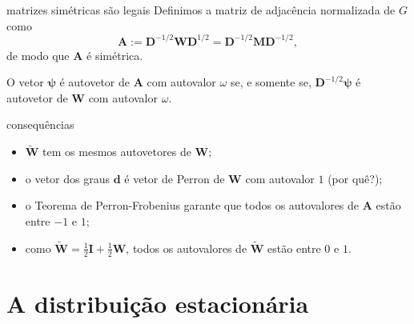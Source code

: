 \documentclass{beamer}
\begin{document}
\begin{frame}{matrizes simétricas são legais}
    Definimos a \alert{matriz de adjacência normalizada} de \(G\) como
    \begin{equation*}
        \mathbf{A} := \mathbf{D}^{-1/2} \mathbf{W} \mathbf{D}^{1/2} = \mathbf{D}^{-1/2} \mathbf{M} \mathbf{D}^{-1/2},
    \end{equation*} de modo que \(\mathbf{A}\) é simétrica.
    \pause
    \begin{prop}
        O vetor \(\mathbf{\psi}\) é autovetor de \(\mathbf{A}\) com autovalor \(\omega\) se, e somente se, \(\mathbf{D}^{-1/2}\mathbf{\psi}\) é autovetor de \(\mathbf{W}\) com autovalor \(\omega\).
    \end{prop}
\end{frame}

\begin{frame}{consequências}
    \begin{itemize}
        \item \(\widetilde{\mathbf{W}}\) tem os mesmos autovetores de \(\mathbf{W}\);\pause
        \item o vetor dos graus \(\mathbf{d}\) é \alert{vetor de Perron} de \(\mathbf{W}\) com autovalor \(1\) (por quê?);\pause
        \item o Teorema de Perron-Frobenius garante que todos os autovalores de \(\mathbf{A}\) estão entre \(-1\) e \(1\);\pause
        \item como \(\widetilde{\mathbf{W}} = \frac{1}{2}\mathbf{I} + \frac{1}{2}\mathbf{W}\), todos os autovalores de \(\widetilde{\mathbf{W}}\) estão entre \(0\) e \(1\).
    \end{itemize}
\end{frame}

\section{A distribuição estacionária}
\end{document}

